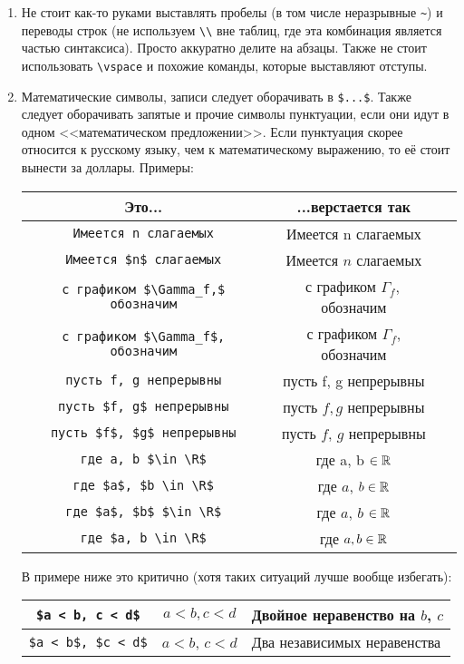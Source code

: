 \begin{enumerate}
\item
	Не стоит как-то руками выставлять пробелы (в том числе неразрывные \verb'~') и
	переводы строк (не используем \verb'\\' вне таблиц, где эта комбинация является частью синтаксиса).
	Просто аккуратно делите на абзацы.
	Также не стоит использовать \verb`\vspace` и похожие команды, которые выставляют отступы.
	
\item
	Математические символы, записи следует оборачивать в \verb'$...$'.
	Также следует оборачивать запятые и прочие символы пунктуации, если они
	идут в одном <<математическом предложении>>.
	Если пунктуация скорее относится к русскому языку, чем к математическому выражению, то её стоит вынести за доллары.
	Примеры:
	\begin{center}\begin{tabular}{|c|c|c|}
		\hline Это... & ...верстается так & \\
		\hline \verb!Имеется n слагаемых! & Имеется n слагаемых \bad \\
		\hline \verb!Имеется $n$ слагаемых! & Имеется $n$ слагаемых \ok \\
		\hline \verb!с графиком $\Gamma_f,$ обозначим! & с графиком $\Gamma_f,$ обозначим \bad \\
		\hline \verb!с графиком $\Gamma_f$, обозначим! & с графиком $\Gamma_f$, обозначим \ok \\
		\hline \verb!пусть f, g непрерывны! & пусть f, g непрерывны \bad \\
		\hline \verb!пусть $f, g$ непрерывны! & пусть $f, g$ непрерывны \bad \\
		\hline \verb!пусть $f$, $g$ непрерывны! & пусть $f$, $g$ непрерывны \ok \\
		\hline \verb!где a, b $\in \R$! & где a, b $\in \mathbb{R}$ \bad \\
		\hline \verb!где $a$, $b \in \R$! & где $a$, $b \in \mathbb{R}$ \bad \\
		\hline \verb!где $a$, $b$ $\in \R$! & где $a$, $b$ $\in \mathbb{R}$ \bad \\
		\hline \verb!где $a, b \in \R$! & где $a, b \in \mathbb{R}$ \ok \\
		\hline 
	\end{tabular}\end{center}

	В примере ниже это критично (хотя таких ситуаций лучше вообще избегать):
	\begin{center}\begin{tabular}{|c|c|l|}
		\hline \verb!$a < b, c < d$! & $a < b, c < d$ & Двойное неравенство на $b$, $c$ \\
		\hline \verb!$a < b$, $c < d$! & $a < b$, $c < d$ & Два независимых неравенства \\
	\hline
	\end{tabular}\end{center}


\end{enumerate}
